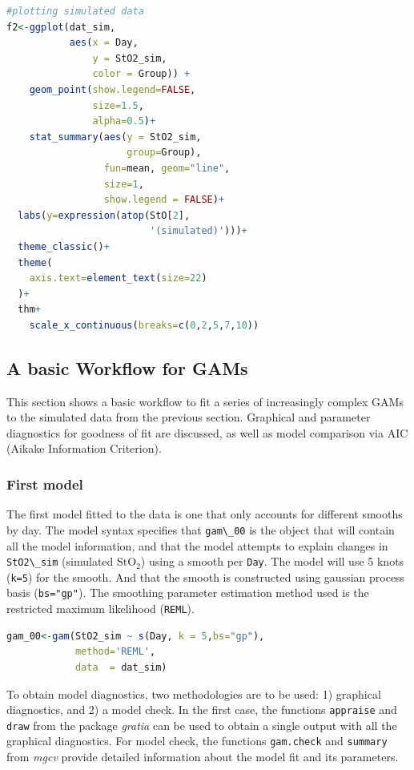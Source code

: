 \documentclass[
]{article}
\newcommand{\passthrough}[1]{#1}
\begin{document}
\begin{lstlisting}[language=R]
#plotting simulated data
f2<-ggplot(dat_sim, 
           aes(x = Day, 
               y = StO2_sim, 
               color = Group)) +
    geom_point(show.legend=FALSE,
               size=1.5,
               alpha=0.5)+
    stat_summary(aes(y = StO2_sim,
                     group=Group), 
                 fun=mean, geom="line",
                 size=1,
                 show.legend = FALSE)+
  labs(y=expression(atop(StO[2],
                         '(simulated)')))+
  theme_classic()+
  theme(
    axis.text=element_text(size=22)
  )+
  thm+
    scale_x_continuous(breaks=c(0,2,5,7,10))
\end{lstlisting}

\hypertarget{a-basic-workflow-for-gams}{%
\subsection{A basic Workflow for GAMs}\label{a-basic-workflow-for-gams}}

This section shows a basic workflow to fit a series of increasingly complex GAMs to the simulated data from the previous section. Graphical and parameter diagnostics for goodness of fit are discussed, as well as model comparison via AIC (Aikake Information Criterion).

\hypertarget{first-model}{%
\subsubsection{First model}\label{first-model}}

The first model fitted to the data is one that only accounts for different smooths by day. The model syntax specifies that \passthrough{\lstinline!gam\_00!} is the object that will contain all the model information, and that the model attempts to explain changes in \passthrough{\lstinline!StO2\_sim!} (simulated \(\mbox{StO}_2\)) using a smooth per \passthrough{\lstinline!Day!}. The model will use 5 knots (\passthrough{\lstinline!k=5!}) for the smooth. And that the smooth is constructed using gaussian process basis (\passthrough{\lstinline!bs="gp"!}). The smoothing parameter estimation method used is the restricted maximum likelihood (\passthrough{\lstinline!REML!}).

\begin{lstlisting}[language=R]
gam_00<-gam(StO2_sim ~ s(Day, k = 5,bs="gp"),
            method='REML',
            data  = dat_sim)
\end{lstlisting}

To obtain model diagnostics, two methodologies are to be used: 1) graphical diagnostics, and 2) a model check. In the first case, the functions \passthrough{\lstinline!appraise!} and \passthrough{\lstinline!draw!} from the package \emph{gratia} can be used to obtain a single output with all the graphical diagnostics. For model check, the functions \passthrough{\lstinline!gam.check!} and \passthrough{\lstinline!summary!} from \emph{mgcv} provide detailed information about the model fit and its parameters.
\end{document}
